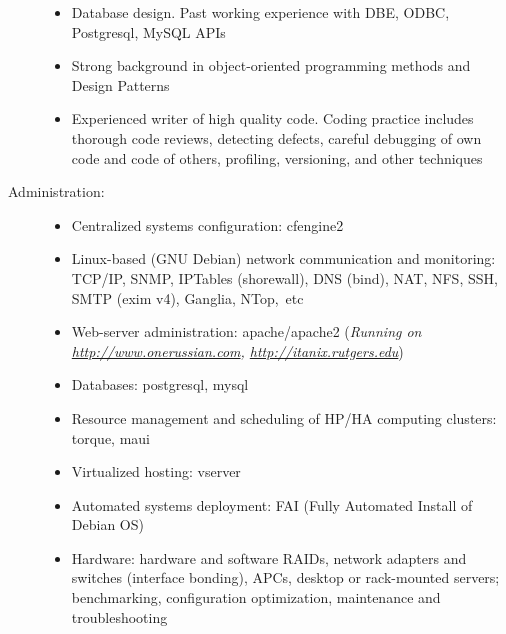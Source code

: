 \documentclass[10pt,overlapped,line]{res}
\newcommand{\wdescription}[1]{({\small \textit{#1}})}
\begin{document}
\begin{resume}
\begin{description}
\begin{itemize}
      \item Database design. Past working experience with DBE, ODBC,
        Postgresql, MySQL APIs

      \item Strong background in object-oriented programming methods
        and Design Patterns

      \item Experienced writer of high quality code. Coding practice
        includes thorough code reviews, detecting defects, careful
        debugging of own code and code of others, profiling,
        versioning, and other techniques
      \end{itemize}

    \item[Administration:] \hspace*{\fill}
      \begin{itemize}

      \item Centralized systems configuration: cfengine2

      \item Linux-based (GNU Debian) network communication and
        monitoring: TCP/IP, SNMP, IPTables (shorewall), DNS (bind), NAT,
        NFS, SSH, SMTP (exim v4), Ganglia, NTop,\ etc

      \item Web-server administration: apache/apache2
        \wdescription{Running on
          \url{http://www.onerussian.com}, \url{http://itanix.rutgers.edu}}

      \item Databases: postgresql, mysql

      \item Resource management and scheduling of HP/HA computing
        clusters: torque, maui

      \item Virtualized hosting: vserver

      \item Automated systems deployment: FAI (Fully Automated Install
        of Debian OS)

      \item Hardware: hardware and software RAIDs, network adapters
        and switches (interface bonding), APCs, desktop or
        rack-mounted servers; benchmarking, configuration
        optimization, maintenance and troubleshooting

      \end{itemize}


\end{description}
\end{resume}
\end{document}
